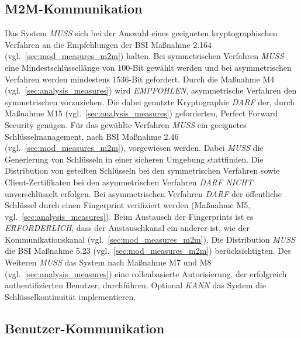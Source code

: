 \documentclass[11pt,a4paper]{report}
\begin{document}
\subsection{M2M-Kommunikation}

Das System \textit{MUSS} sich bei der Auswahl eines geeigneten kryptographischen Verfahren an die Empfehlungen der BSI Maßnahme 2.164 (vgl.~\ref{sec:mod_measures_m2m}) halten. Bei symmetrischen Verfahren \textit{MUSS} eine Mindestschlüssellänge von 100-Bit gewählt werden und bei asymmetrischen Verfahren werden mindestens 1536-Bit gefordert. Durch die Maßnahme M4 (vgl.~\ref{sec:analysis_measures}) wird \textit{EMPFOHLEN}, asymmetrische Verfahren den symmetrischen vorzuziehen. Die dabei genutzte Kryptographie \textit{DARF} der, durch Maßnahme M15 (vgl.~\ref{sec:analysis_measures}) geforderten, Perfect Forward Security genügen. Für das gewählte Verfahren \textit{MUSS} ein geeignetes Schlüsselmanagement, nach BSI Maßnahme 2.46 (vgl.~\ref{sec:mod_measures_m2m}), vorgewiesen werden. Dabei \textit{MUSS} die Generierung von Schlüsseln in einer sicheren Umgebung stattfinden. Die Distribution von geteilten Schlüsseln bei den symmetrischen Verfahren sowie Client-Zertifikaten bei den asymmetrischen Verfahren \textit{DARF NICHT} unverschlüsselt erfolgen. Bei asymmetrischen Verfahren \textit{DARF} der öffentliche Schlüssel durch einen Fingerprint verifiziert werden (Maßnahme M5, vgl.~\ref{sec:analysis_measures}). Beim Austausch der Fingerprints ist es \textit{ERFORDERLICH}, dass der Austauschkanal ein anderer ist, wie der Kommunikationskanal (vgl.~\ref{sec:mod_measures_m2m}). Die Distribution \textit{MUSS} die BSI Maßnahme 5.23 (vgl.~\ref{sec:mod_measures_m2m}) berücksichtigten. Des Weiteren \textit{MUSS} das System nach Maßnahme M7 und M8 (vgl.~\ref{sec:analysis_measures}) eine rollenbasierte Autorisierung, der erfolgreich authentifizierten Benutzer, durchführen. Optional \textit{KANN} das System die Schlüsselkontinuität implementieren.

\subsection{Benutzer-Kommunikation}
\end{document}
